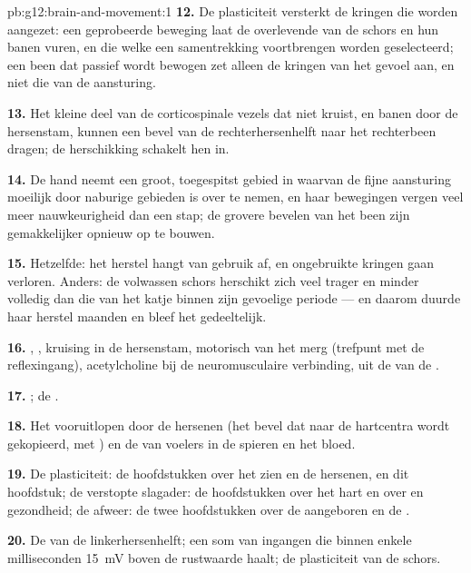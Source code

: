 \begin{solution}{pb:g12:brain-and-movement:1}
\textbf{12.} De plasticiteit versterkt de kringen die worden aangezet: een
geprobeerde beweging laat de overlevende  van de schors en hun
banen vuren, en die welke een samentrekking voortbrengen worden
geselecteerd; een been dat passief wordt bewogen zet alleen de kringen van
het gevoel aan, en niet die van de aansturing.

\textbf{13.} Het kleine deel van de corticospinale vezels dat niet kruist,
en banen door de hersenstam, kunnen een bevel van de rechterhersenhelft
naar het rechterbeen dragen; de herschikking schakelt hen in.

\textbf{14.} De hand neemt een groot, toegespitst gebied in waarvan de
fijne aansturing moeilijk door naburige gebieden is over te nemen, en haar
bewegingen vergen veel meer nauwkeurigheid dan een stap; de grovere
bevelen van het been zijn gemakkelijker opnieuw op te bouwen.

\textbf{15.} Hetzelfde: het herstel hangt van gebruik af, en ongebruikte
kringen gaan verloren. Anders: de volwassen schors herschikt zich veel
trager en minder volledig dan die van het katje binnen zijn gevoelige
periode --- en daarom duurde haar herstel maanden en bleef het
gedeeltelijk.

\textbf{16.} , , kruising in de
hersenstam, motorisch  van het merg (trefpunt met de reflexingang),
acetylcholine bij de neuromusculaire verbinding,  uit de 
van de .

\textbf{17.} ; de .

\textbf{18.} Het vooruitlopen door de hersenen (het bevel dat naar de
hartcentra wordt gekopieerd, met ) en de  van
voelers in de spieren en het bloed.

\textbf{19.} De plasticiteit: de hoofdstukken over het zien en de
hersenen, en dit hoofdstuk; de verstopte slagader: de hoofdstukken over
het hart en over  en gezondheid; de afweer: de twee
hoofdstukken over de aangeboren en de .

\textbf{20.} De  van de linkerhersenhelft; een
som van ingangen die binnen enkele milliseconden \qty{15}{mV} boven de
rustwaarde haalt; de plasticiteit van de schors.
\end{solution}
